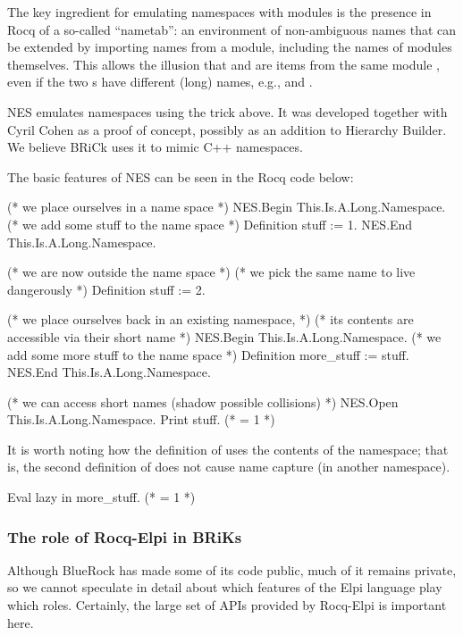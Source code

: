 \documentclass[a4paper, 11pt]{book}
\begin{document}
The key ingredient for emulating namespaces with modules is the presence in
Rocq of a so-called ``nametab'': an environment of non-ambiguous names that can
be extended by importing names from a module, including the names of modules
themselves. This allows the illusion that  and  are items
from the same module , even if the two s have different (long)
names, e.g.,  and .

NES emulates namespaces using the trick above. It was developed together with
Cyril Cohen as a proof of concept, possibly as an addition to Hierarchy
Builder. We believe BRiCk uses it to mimic C++ namespaces.

The basic features of NES can be seen in the Rocq code below:

\begin{rocqcode}
(* we place ourselves in a name space *)
NES.Begin This.Is.A.Long.Namespace.
  (* we add some stuff to the name space *)
  Definition stuff := 1.
NES.End This.Is.A.Long.Namespace.

(* we are now outside the name space *)
(* we pick the same name to live dangerously *)
Definition stuff := 2.

(* we place ourselves back in an existing namespace, *)
(* its contents are accessible via their short name *)
NES.Begin This.Is.A.Long.Namespace.
  (* we add some more stuff to the name space *)
  Definition more_stuff := stuff.
NES.End This.Is.A.Long.Namespace.

(* we can access short names (shadow possible collisions) *)
NES.Open This.Is.A.Long.Namespace.
Print stuff. (* = 1 *)
\end{rocqcode}


It is worth noting how the definition of  uses the contents
of the namespace; that is, the second definition of  does not
cause name capture (in another namespace).

\begin{rocqcode}
Eval lazy in more_stuff. (* = 1 *)
\end{rocqcode}

\subsubsection{The role of Rocq-Elpi in BRiKs}

Although BlueRock has made some of its code public, much of it remains
private, so we cannot speculate in detail about which features of the Elpi
language play which roles. Certainly, the large set of APIs provided by
Rocq-Elpi is important here.
\end{document}
